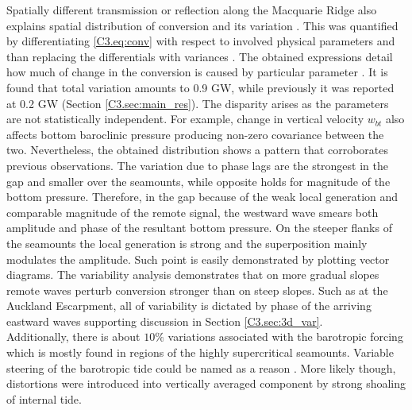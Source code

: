 \documentclass[12pt]{article}
\begin{document}
Spatially different transmission or reflection along the Macquarie Ridge also explains spatial 
distribution of conversion and its variation . This was quantified by 
differentiating \eqref{C3.eq:conv} with respect to involved physical parameters and than replacing the 
differentials with variances \citep{kerry2014impact}. The obtained expressions detail how much of 
change in the conversion is caused by particular parameter . It is found that 
total variation amounts to 0.9 GW, while previously it was reported at 0.2 GW (Section 
\ref{C3.sec:main_res}). The disparity arises as the parameters are not statistically independent. 
For example, change in vertical velocity $w_{bt}$ also affects bottom baroclinic pressure producing 
non-zero covariance between the two. Nevertheless, the obtained distribution shows a pattern that 
corroborates previous observations. The variation due to phase lags are the strongest in the gap 
and smaller over the seamounts, while opposite holds for magnitude of the bottom pressure. 
Therefore, in the gap because of the weak local generation and comparable magnitude of the remote 
signal, the westward wave smears both amplitude and phase of the resultant bottom pressure. On the 
steeper flanks of the seamounts the local generation is strong and the superposition mainly  
modulates the amplitude. Such point is easily demonstrated by plotting vector diagrams. The variability analysis demonstrates that on more gradual slopes remote waves perturb conversion stronger than on steep slopes. 
Such as at the Auckland Escarpment, all of variability is dictated by phase of the arriving eastward 
waves supporting discussion in Section \ref{C3.sec:3d_var}.\\
Additionally, there is about $10\%$ variations associated with the barotropic forcing which is mostly found in regions of the highly supercritical seamounts. Variable  steering of the barotropic tide could be named as a reason  \citep{holloway1999internal}. More likely though, distortions were introduced into vertically averaged component by strong shoaling of internal tide.\\
\end{document}
